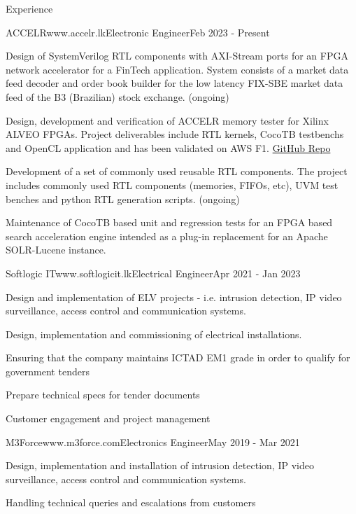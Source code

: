 \documentclass[
	11pt, %
]{./assets/resume} %
\begin{document}
\begin{rSection}{Experience}

	\begin{rSubsectionX}{ACCELR}{www.accelr.lk}{Electronic Engineer}{Feb 2023 - Present}
		\item Design of SystemVerilog RTL components with AXI-Stream ports for an FPGA network accelerator for a FinTech application. System consists of a market data feed decoder and order book builder for the low latency FIX-SBE market data feed of the B3 (Brazilian) stock exchange. (ongoing) 
		\item Design, development and verification of ACCELR memory tester for Xilinx ALVEO FPGAs. Project deliverables include RTL kernels, CocoTB testbenchs and OpenCL application and has been validated on AWS F1. \href{https://github.com/accelr-net/alveo-memory-tester}{GitHub Repo}
		\item Development of a set of commonly used reusable RTL components. The project includes commonly used RTL components (memories, FIFOs, etc), UVM test benches and python RTL generation scripts. (ongoing)
		\item Maintenance of CocoTB based unit and regression tests for an FPGA based search acceleration engine intended as a plug-in replacement for an Apache SOLR-Lucene instance.  
	\end{rSubsectionX}

	\begin{rSubsectionX}{Softlogic IT}{www.softlogicit.lk}{Electrical Engineer}{Apr 2021 - Jan 2023}
		\item Design and implementation of ELV projects - i.e. intrusion detection, IP video surveillance, access control and communication systems.
		\item Design, implementation and commissioning of electrical installations. 
		\item Ensuring that the company maintains ICTAD EM1 grade in order to qualify for government tenders
		\item Prepare technical specs for tender documents
		\item Customer engagement and project management
	\end{rSubsectionX}

	\begin{rSubsectionX}{M3Force}{www.m3force.com}{Electronics Engineer}{May 2019 - Mar 2021}
		\item Design, implementation and installation of intrusion detection, IP video surveillance, access control and communication systems.
		\item Handling technical queries and escalations from customers 
	\end{rSubsectionX}


\end{rSection}
\end{document}
